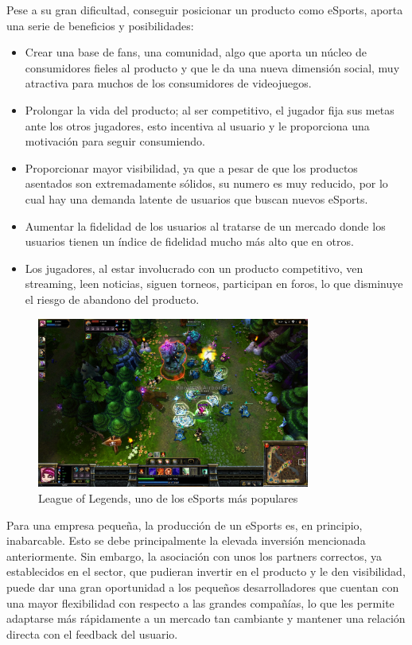 Pese a su gran dificultad, conseguir posicionar un producto como eSports, aporta una serie de beneficios y posibilidades: 
\begin{itemize}
\item Crear una base de fans, una comunidad, algo que aporta un núcleo de consumidores fieles al producto y que le da una nueva dimensión social, muy atractiva para muchos de los consumidores de videojuegos.
\item Prolongar la vida del producto; al ser competitivo, el jugador fija sus metas ante los otros jugadores, esto incentiva al usuario y le proporciona una motivación para seguir consumiendo.
\item Proporcionar mayor visibilidad, ya que a pesar de que los productos asentados son extremadamente sólidos, su numero es muy reducido, por lo cual hay una demanda latente de usuarios que buscan nuevos eSports.
\item Aumentar la fidelidad de los usuarios al tratarse de un mercado donde los usuarios tienen un índice de fidelidad mucho más alto que en otros.
\item Los jugadores, al estar involucrado con un producto competitivo, ven streaming, leen noticias, siguen torneos, participan en foros, lo que disminuye el riesgo de abandono del producto.
\end{itemize}

\begin{figure}[h]
    \centering
    \includegraphics[width=0.8\textwidth]{images/estadodelarte/mercado/foto-lol}
    \caption{League of Legends, uno de los eSports más populares}
\end{figure}

Para una empresa pequeña, la producción de un eSports es, en principio, inabarcable. Esto se debe principalmente la elevada inversión mencionada anteriormente. Sin embargo, la asociación con unos los partners correctos, ya establecidos en el sector, que pudieran invertir en el producto y le den visibilidad, puede dar una gran oportunidad a los pequeños desarrolladores que cuentan con una mayor flexibilidad con respecto a las grandes compañías, lo que les permite adaptarse más rápidamente a un mercado tan cambiante y mantener una relación directa con el feedback del usuario.


